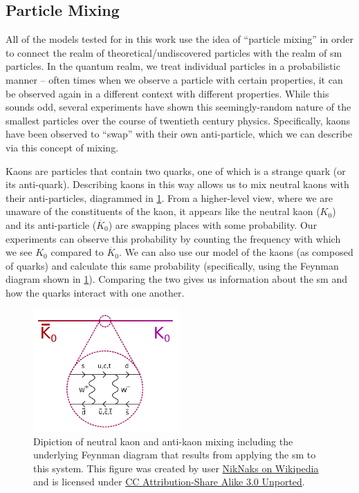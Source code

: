 \subsection{Particle Mixing}
All of the models tested for in this work use the idea of ``particle mixing'' in order
to connect the realm of theoretical/undiscovered particles with the realm of \ac{sm}
particles. In the quantum realm, we treat individual particles in a probabilistic
manner -- often times when we observe a particle with certain properties, it can
be observed again in a different context with different properties.
While this sounds odd, several experiments have shown this seemingly-random nature
of the smallest particles over the course of twentieth century physics.
Specifically, kaons have been observed to ``swap'' with their own anti-particle,
which we can describe via this concept of mixing.

Kaons are particles that contain two quarks, one of which is a strange quark (or its
anti-quark). Describing kaons in this way allows us to mix neutral kaons with their
anti-particles, diagrammed in \cref{fig:kaon-box-diagram}. From a higher-level view,
where we are unaware of the constituents of the kaon, it appears like the neutral kaon (\(K_0\))
and its anti-particle (\(\overline{K}_0\)) are swapping places with some probability.
Our experiments can observe this probability by counting the frequency with which we
see \(K_0\) compared to \(\overline{K}_0\).
We can also use our model of the kaons (as composed of quarks) and calculate this
same probability (specifically, using the Feynman diagram shown in \cref{fig:kaon-box-diagram}).
Comparing the two gives us information about the \ac{sm} and how the quarks
interact with one another.

\begin{figure}
	\centering
	\includegraphics[width=0.5\textwidth]{figures/intro/Kaon-box-diagram-with-bar.pdf}
	\caption{
		Dipiction of neutral kaon and anti-kaon mixing including the underlying
		Feynman diagram that results from applying the \ac{sm} to this system.
		This figure was created by user
		\href{https://commons.wikimedia.org/wiki/File:Kaon-box-diagram-with-bar.svg}{NikNaks on Wikipedia}
		and is licensed under
		\href{https://creativecommons.org/licenses/by-sa/3.0/deed.en}{CC Attribution-Share Alike 3.0 Unported}.
	}
	\label{fig:kaon-box-diagram}
\end{figure}

